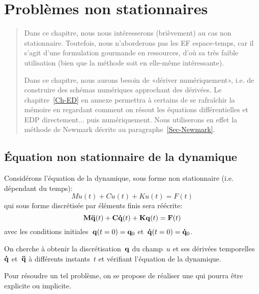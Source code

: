 \chapter{Problèmes non stationnaires}\label{Ch-temps}
\begin{abstract}
Dans ce chapitre, nous nous intéresserons (brièvement) au cas non stationnaire. Toutefois, nous n'aborderons pas les EF espace-temps, car il s'agit d'une formulation gourmande en ressources, d'où sa très faible utilisation (bien que la méthode soit en elle-même intéressante).

Dans ce chapitre, nous aurons besoin de «dériver numériquement», i.e. de construire des schémas numériques approchant des dérivées. Le chapitre~\ref{Ch-ED} en annexe permettra à certains de se rafraîchir la mémoire en regardant comment on résout les équations différentielles et EDP directement... puis numériquement. Nous utiliserons en effet la méthode de Newmark décrite au paragraphe~\ref{Sec-Newmark}.
\end{abstract}

\medskip
\section{Équation non stationnaire de la dynamique}

Considérons l'équation de la dynamique, sous forme non stationnaire (i.e. dépendant du temps):
\begin{equation} M \ddot u(t) + C \dot u(t) + K u(t)= F(t) \end{equation}
qui sous forme discrétisée par éléments finis sera réécrite:
\begin{equation} \MM{M}\VV{\ddot q}(t) + \MM{C}\VV{\dot q}(t) + \MM{K}\VV{q}(t)= \VV{F}(t) \end{equation}
avec les conditions initiales~$\VV{q}(t=0)=\VV{q}_0$ et~$\VV{\dot q}(t=0)=\VV{\dot q}_0$.

\medskip
On cherche à obtenir la discrétisation~$\VV{q}$ du champ~$u$ et ses dérivées temporelles~$\VV{\dot q}$ et~$\VV{\ddot q}$ à différents instants~$t$ et vérifiant l'équation de la dynamique.

\medskip
Pour résoudre un tel problème, on se propose de réaliser une  qui pourra être explicite ou implicite.

